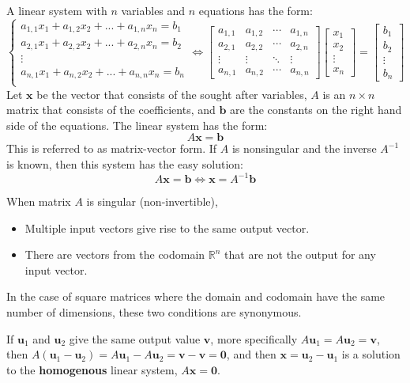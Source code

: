\documentclass{article}
\begin{document}
A linear system with \(n\) variables and \(n\) equations has the form:
\[\left\{\begin{array}{c}
a_{1,1}x_1 + a_{1,2}x_2 + ... + a_{1,n}x_n = b_1 \\
a_{2,1}x_1 + a_{2,2}x_2 + ... + a_{2,n}x_n = b_2 \\
\vdots \\
a_{n,1}x_1 + a_{n,2}x_2 + ... + a_{n,n}x_n = b_n \\
\end{array}\right.
\iff 
\begin{bmatrix}
a_{1,1} & a_{1,2} & \cdots & a_{1,n} \\  
a_{2,1} & a_{2,2} & \cdots & a_{2,n} \\  
\vdots & \vdots & \ddots & \vdots \\ 
a_{n,1} & a_{n,2} & \cdots & a_{n,n}
\end{bmatrix}\begin{bmatrix}
x_1 \\ x_2 \\ \vdots \\ x_n 
\end{bmatrix} = \begin{bmatrix}
b_1 \\ b_2 \\ \vdots \\ b_n
\end{bmatrix}\]
Let \(\mathbf{x}\) be the vector that consists of the sought after variables, \(A\) is an \(n \times n\) matrix that consists of the coefficients, and \(\mathbf{b}\) are the constants on the right hand side of the equations. The linear system has the form:
\[A\mathbf{x} = \mathbf{b}\]
This is referred to as matrix-vector form. If \(A\) is nonsingular and the inverse \(A^{-1}\) is known, then this system has the easy solution:
\[A\mathbf{x} = \mathbf{b} \iff \mathbf{x} = A^{-1}\mathbf{b}\]

When matrix \(A\) is singular (non-invertible), 
\begin{itemize} 
\item Multiple input vectors give rise to the same output vector. 
\item There are vectors from the codomain \(\mathbb{R}^n\) that are not the output for any input vector.  
\end{itemize}
In the case of square matrices where the domain and codomain have the same number of dimensions, these two conditions are synonymous. 

If \(\mathbf{u}_1\) and \(\mathbf{u}_2\) give the same output value \(\mathbf{v}\), more specifically \(A\mathbf{u}_1 = A\mathbf{u}_2 = \mathbf{v}\), then \(A(\mathbf{u}_1 - \mathbf{u}_2) = A\mathbf{u}_1 - A\mathbf{u}_2 = \mathbf{v} - \mathbf{v} = \mathbf{0}\), and then \(\mathbf{x} = \mathbf{u}_2 - \mathbf{u}_1\) is a solution to the {\bf homogenous} linear system, \(A\mathbf{x} = \mathbf{0}\).
\end{document}
